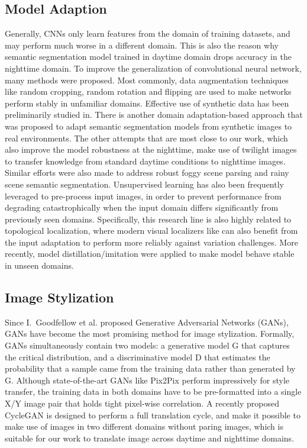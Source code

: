 \documentclass[a4paper]{spie}
\begin{document}
\subsection{Model Adaption}
Generally, CNNs only learn features from the domain of training datasets, and may perform much worse in a different domain. This is also the reason why semantic segmentation model trained in daytime domain drops accuracy in the nighttime domain. To improve the generalization of convolutional neural network, many methods were proposed. Most commonly, data augmentation techniques like random cropping, random rotation and flipping are used to make networks perform stably in unfamiliar domains\cite{yang2019robustifying}. Effective use of synthetic data has been preliminarily studied in\cite{sadat2018effective,xu2019semantic}. There is another domain adaptation-based approach that was proposed to adapt semantic segmentation models from synthetic images to real environments\cite{sankaranarayanan2018learning}. The other attempts that are most close to our work, which also improve the model robustness at the nighttime, make use of twilight images to transfer knowledge from standard daytime conditions to nighttime images\cite{dai2018dark,sakaridis2019semantic}. Similar efforts were also made to address robust foggy scene parsing\cite{sakaridis2018model,dai2019curriculum} and rainy scene semantic segmentation\cite{porav2019can,hu2019depth}. Unsupervised learning has also been frequently leveraged to pre-process input images, in order to prevent performance from degrading catastrophically when the input domain differs significantly from previously seen domains\cite{romera2019bridging,porav2019don}. Specifically, this research line is also highly related to topological localization\cite{porav2019don,larsson2019cross}, where modern visual localizers like\cite{lin2018visual,cheng2019panoramic} can also benefit from the input adaptation to perform more reliably against variation challenges. More recently, model distillation/imitation were applied to make model behave stable in unseen domains\cite{hinton2015distilling,gupta2016cross}.

\subsection{Image Stylization}
Since I.~Goodfellow et al. proposed Generative Adversarial Networks (GANs)\cite{goodfellow2014generative}, GANs have become the most promising method for image stylization. Formally, GANs simultaneously contain two models: a generative model G that captures the critical distribution, and a discriminative model D that estimates the probability that a sample came from the training data rather than generated by G. Although state-of-the-art GANs like Pix2Pix\cite{isola2017image} perform impressively for style transfer, the training data in both domains have to be pre-formatted into a single X/Y image pair that holds tight pixel-wise correlation. A recently proposed CycleGAN\cite{zhu2017unpaired} is designed to perform a full translation cycle, and make it possible to make use of images in two different domains without paring images, which is suitable for our work to translate image across daytime and nighttime domains.
\end{document}
